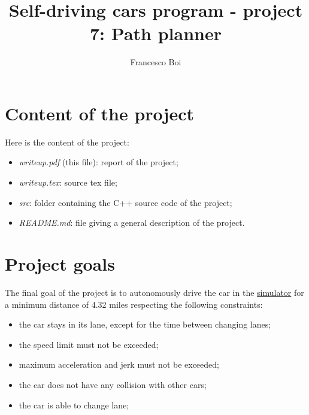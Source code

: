 \documentclass{article}
\author{Francesco Boi}
\title{Self-driving cars program - project  7: Path planner}
\date{}
\begin{document}

\maketitle
\tableofcontents 

\lstset{escapechar=ç,style=customc}
\section{Content of the project}
Here is the content of the project:
\begin{itemize}
\item \textit{writeup.pdf} (this file): report of the project;
\item \textit{writeup.tex}: source tex file;
\item \textit{src}: folder containing the C++ source code of the project;
\item \textit{README.md}: file giving a general description of the project.
\end{itemize}

\section{Project goals}
The final goal of the project is to autonomously drive the car in the \href{https://github.com/udacity/self-driving-car-sim/releases/tag/T3\_v1.2}{simulator} for a minimum distance of 4.32 miles respecting the following constraints:
\begin{itemize}
\item the car stays in its lane, except for the time between changing lanes;
\item the speed limit must not be exceeded;
\item maximum acceleration and jerk must not be exceeded;
\item the car does not have any collision with other cars;
\item the car is able to change lane;
\end{itemize}
\end{document}
